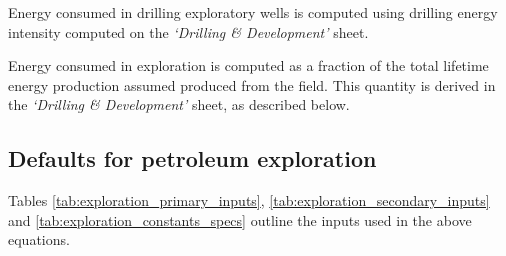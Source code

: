 \documentclass[11pt]{report}
\newcommand{\sheet}[1]{\textit{`{#1}'}}
\begin{document}
Energy consumed in drilling exploratory wells is computed using drilling energy intensity computed on the \sheet{Drilling \& Development} sheet.

Energy consumed in exploration is computed as a fraction of the total lifetime energy production assumed produced from the field.  This quantity is derived in the \sheet{Drilling \& Development} sheet, as described below.

\subsection{Defaults for petroleum exploration}

Tables  \ref{tab:exploration_primary_inputs}, \ref{tab:exploration_secondary_inputs} and \ref{tab:exploration_constants_specs} outline the inputs used in the above equations.
\end{document}
